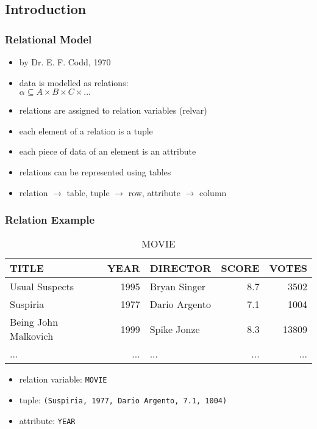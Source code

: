 \documentclass[dvipsnames]{beamer}
\theoremstyle{plain}
\begin{document}
\subsection{Introduction}

\begin{frame}
  \frametitle{Relational Model}

  \begin{itemize}
    \item by Dr. E. F. Codd, 1970

    \item data is modelled as \alert{relations}:\\
      $\alpha \subseteq A \times B \times C \times ...$

    \pause
    \medskip
    \item relations are assigned to \alert{relation variables} (relvar)
    \item each element of a relation is a \alert{tuple}
    \item each piece of data of an element is an \alert{attribute}

    \pause
    \medskip
    \item relations can be represented using tables
    \item relation $\rightarrow$ table, tuple $\rightarrow$ row,
      attribute $\rightarrow$ column
  \end{itemize}
\end{frame}

\begin{frame}
  \frametitle{Relation Example}

  \begin{footnotesize}
  \begin{table}
    \caption{MOVIE}
    \begin{tabular}{|l|r|l|r|r|}\hline
TITLE                & YEAR & DIRECTOR      & SCORE & VOTES\\\hline\hline
Usual Suspects       & 1995 & Bryan Singer  &   8.7 &  3502\\\hline
Suspiria             & 1977 & Dario Argento &   7.1 &  1004\\\hline
Being John Malkovich & 1999 & Spike Jonze   &   8.3 & 13809\\\hline
...                  &  ... & ...           &   ... &   ...\\\hline
    \end{tabular}
  \end{table}
  \end{footnotesize}

  \begin{itemize}
    \item relation variable: \texttt{MOVIE}
    \item tuple: \texttt{(Suspiria, 1977, Dario Argento, 7.1, 1004)}
    \item attribute: \texttt{YEAR}
  \end{itemize}
\end{frame}
\end{document}
